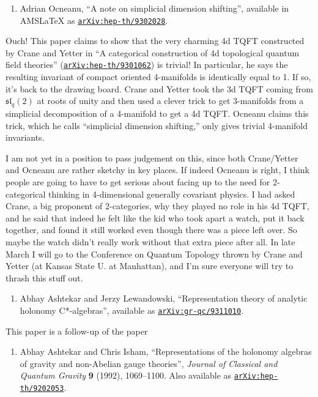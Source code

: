 \documentclass{article}
\def\tightlist{}
\begin{document}
\begin{enumerate}
\def\labelenumi{\arabic{enumi})}
\setcounter{enumi}{2}
\tightlist
\item
  Adrian Ocneanu, ``A note on simplicial dimension shifting'', available
  in AMSLaTeX as
  \href{http://arxiv.org/abs/hep-th/9302028}{\texttt{arXiv:hep-th/9302028}}.
\end{enumerate}

Ouch! This paper claims to show that the very charming 4d TQFT
constructed by Crane and Yetter in ``A categorical construction of 4d
topological quantum field theories''
(\href{http://arxiv.org/abs/hep-th/9301062}{\texttt{arXiv:hep-th/9301062}})
is trivial! In particular, he says the resulting invariant of compact
oriented 4-manifolds is identically equal to 1. If so, it's back to the
drawing board. Crane and Yetter took the 3d TQFT coming from
\(\mathfrak{sl}_q(2)\) at roots of unity and then used a clever trick to
get 3-manifolds from a simplicial decomposition of a 4-manifold to get a
4d TQFT. Ocneanu claims this trick, which he calls ``simplicial
dimension shifting,'' only gives trivial 4-manifold invariants.

I am not yet in a position to pass judgement on this, since both
Crane/Yetter and Ocneanu are rather sketchy in key places. If indeed
Ocneanu is right, I think people are going to have to get serious about
facing up to the need for 2-categorical thinking in 4-dimensional
generally covariant physics. I had asked Crane, a big proponent of
2-categories, why they played no role in his 4d TQFT, and he said that
indeed he felt like the kid who took apart a watch, put it back
together, and found it still worked even though there was a piece left
over. So maybe the watch didn't really work without that extra piece
after all. In late March I will go to the Conference on Quantum Topology
thrown by Crane and Yetter (at Kansas State U. at Manhattan), and I'm
sure everyone will try to thrash this stuff out.

\begin{enumerate}
\def\labelenumi{\arabic{enumi})}
\setcounter{enumi}{3}
\tightlist
\item
  Abhay Ashtekar and Jerzy Lewandowski, ``Representation theory of
  analytic holonomy C*-algebras'', available as
  \href{http://arxiv.org/abs/gr-qc/9311010}{\texttt{arXiv:gr-qc/9311010}}.
\end{enumerate}

This paper is a follow-up of the paper

\begin{enumerate}
\def\labelenumi{\arabic{enumi})}
\setcounter{enumi}{4}
\tightlist
\item
  Abhay Ashtekar and Chris Isham, ``Representations of the holonomy
  algebras of gravity and non-Abelian gauge theories'', \emph{Journal of
  Classical and Quantum Gravity} \textbf{9} (1992), 1069--1100. Also
  available as
  \href{http://arxiv.org/abs/hep-th/9202053}{\texttt{arXiv:hep-th/9202053}}.
\end{enumerate}
\end{document}
